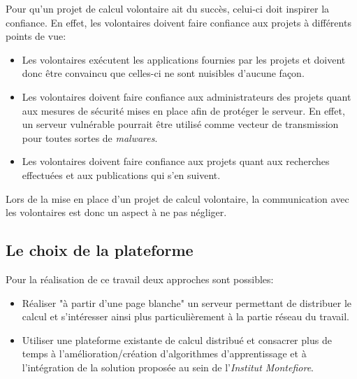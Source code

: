 \documentclass[a4paper, 11pt]{article}
\begin{document}
Pour qu'un projet de calcul volontaire ait du succès, celui-ci doit inspirer la confiance. En effet, les volontaires doivent faire confiance aux projets à différents points de vue:
\begin{itemize}
\item Les volontaires exécutent les applications fournies par les projets et doivent donc être convaincu que celles-ci ne sont nuisibles d'aucune façon.
\item Les volontaires doivent faire confiance aux administrateurs des projets quant aux mesures de sécurité mises en place afin de protéger le serveur. En effet, un serveur vulnérable pourrait être utilisé comme vecteur de transmission pour toutes sortes de \textit{malwares}.
\item Les volontaires doivent faire confiance aux projets quant aux recherches effectuées et aux publications qui s'en suivent.
\end{itemize}
Lors de la mise en place d'un projet de calcul volontaire, la communication avec les volontaires est donc un aspect à ne pas négliger.

\subsection{Le choix de la plateforme}
Pour la réalisation de ce travail deux approches sont possibles:
\begin{itemize}
\item Réaliser "à partir d'une page blanche" un serveur permettant de distribuer le calcul et s'intéresser ainsi plus particulièrement à la partie réseau du travail.
\item Utiliser une plateforme existante de calcul distribué et consacrer plus de temps à l'amélioration/création d'algorithmes d'apprentissage et à l'intégration de la solution proposée au sein de l'\textit{Institut Montefiore}.
\end{itemize}
\end{document}
